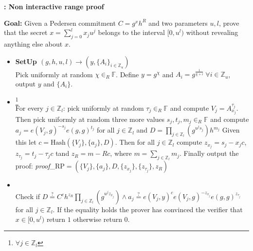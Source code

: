 \begin{algorithm}[]
\caption{\textbf{: Non interactive range proof}}
\textbf{Goal:} Given a Pedersen commitment $C=g^x h^R$ and two parameters $u,l$, prove that the secret $x=\sum_{j=0}^l x_j u^j$ belongs to the interval $[0,u^l)$ without revealing anything else about $x$.
\vspace{2pt}
\hline
\vspace{2pt}
\begin{itemize}
  \item\textbf{SetUp $(g,h,u,l)\xrightarrow[]{}(y,\{A_{i}\}_{i\in\mathds{Z}_u})$}\\
Pick uniformly at random $\chi\in_R\mathds{F}$. Define $y=g^\chi$ and $A_i=g^{\frac{1}{\chi+i}} \: \forall i\in\mathds{Z}_u$, output $y$ and $\{A_i\}$.

\item{}\footnote{$\forall j\in\mathds{Z}_l$}\\
 For every $j\in\mathds{Z}_l$: pick uniformly at random $\tau_j\in_R\mathds{F}$ and compute $V_j=A_{x_j}^{\tau_j}$. Then pick uniformly at random three more values $s_j,t_j,m_j\in_R\mathds{F}$ and compute $a_j=e(V_j,g)^{-s_j}e(g,g)^{t_j}$ for all $j\in\mathds{Z}_l$ and $D=\prod_{j\in\mathds{Z}_l}(g^{u^js_j})h^{m_j}$ Given this let $c=\text{Hash}(\{V_j\},\{a_j\},D)$. Then for all $j\in\mathds{Z}_l$ compute $z_{x_j}=s_j-x_jc$,$z_{\tau_j}=t_j-\tau_jc$ tand $z_R=m-Rc$, where $m=\sum_{j\in\mathds{Z}_l}m_j$. Finally output the proof: \textit{proof}_{RP}$=(\{V_j\},\{a_j\},D,\{z_{x_j}\},\{z_{\tau_j}\},z_R)$ 

\item{}\\
Check if $D\overset{?}{=}C^ch^{z_R}\prod_{j\in\mathds{Z}_l}(g^{u^j z_{x_j}})\wedge a_j \overset{?}{=} e(V_j,y)^c e(V_j,g)^{-z_{x_j}}e(g,g)^{z_{\tau_j}}$ for all $j\in\mathds{Z}_l$.  If the equality holds the prover has convinced the verifier that $x\in [0,u^l)$ return $1$ otherwise return $0$.
\end{itemize}
\label{alg:ZKRP}
\end{algorithm}

